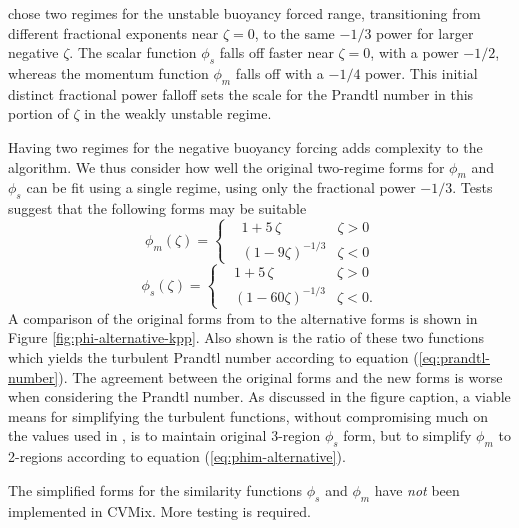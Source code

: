 \cite{LargeKPP} chose two regimes for the unstable buoyancy forced
range, transitioning from different fractional exponents near $\zeta =
0$, to the same $-1/3$ power for larger negative $\zeta$.  The scalar
function $\phi_{s}$ falls off faster near $\zeta=0$, with a power
$-1/2$, whereas the momentum function $\phi_{m}$ falls off with a
$-1/4$ power.  This initial distinct fractional power falloff sets the
scale for the Prandtl number in this portion of $\zeta$ in the weakly
unstable regime.

Having two regimes for the negative buoyancy forcing adds complexity
to the algorithm.  We thus consider how well the original two-regime
forms for $\phi_{m}$ and $\phi_{s}$ can be fit using a single regime,
using only the fractional power $-1/3$.  Tests suggest that the
following forms may be suitable
\begin{equation}
   \phi_{m}(\zeta) = \left\{
 \begin{array}{lll}
  &1 + 5 \, \zeta      &\zeta > 0 \\
  &(1-9\zeta)^{-1/3}  &\zeta < 0 
 \end{array}
 \right.
\label{eq:phim-alternative}
\end{equation}
\begin{equation}
   \phi_{s}(\zeta) = \left\{
 \begin{array}{lll}
  &1 + 5 \, \zeta      &\zeta > 0 \\
  &(1-60\zeta)^{-1/3}  &\zeta < 0. 
 \end{array}
 \right.
\label{eq:phis-alternative}
\end{equation}
A comparison of the original forms from \cite{LargeKPP} to the
alternative forms is shown in Figure
\ref{fig:phi-alternative-kpp}. Also shown is the ratio of these two
functions which yields the turbulent Prandtl number according to
equation (\ref{eq:prandtl-number}).  The agreement between the
original forms and the new forms is worse when considering the Prandtl
number.  As discussed in the figure caption, a viable means for
simplifying the turbulent functions, without compromising much on the
values used in \cite{LargeKPP}, is to maintain original 3-region
$\phi_{s}$ form, but to simplify $\phi_{m}$ to 2-regions according to
equation (\ref{eq:phim-alternative}).  

The simplified forms for the similarity functions $\phi_{s}$ and
$\phi_{m}$ have {\it not} been implemented in CVMix.  More testing is
required.


